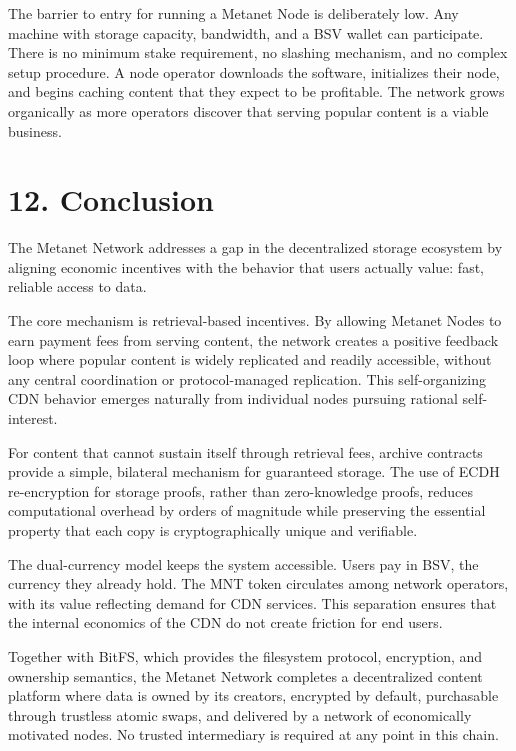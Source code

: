 \documentclass[11pt,a4paper]{article}
\begin{document}
The barrier to entry for running a Metanet Node is deliberately low. Any machine with storage capacity, bandwidth, and a BSV wallet can participate. There is no minimum stake requirement, no slashing mechanism, and no complex setup procedure. A node operator downloads the software, initializes their node, and begins caching content that they expect to be profitable. The network grows organically as more operators discover that serving popular content is a viable business.

\section{12. Conclusion}

The Metanet Network addresses a gap in the decentralized storage ecosystem by aligning economic incentives with the behavior that users actually value: fast, reliable access to data.

The core mechanism is retrieval-based incentives. By allowing Metanet Nodes to earn payment fees from serving content, the network creates a positive feedback loop where popular content is widely replicated and readily accessible, without any central coordination or protocol-managed replication. This self-organizing CDN behavior emerges naturally from individual nodes pursuing rational self-interest.

For content that cannot sustain itself through retrieval fees, archive contracts provide a simple, bilateral mechanism for guaranteed storage. The use of ECDH re-encryption for storage proofs, rather than zero-knowledge proofs, reduces computational overhead by orders of magnitude while preserving the essential property that each copy is cryptographically unique and verifiable.

The dual-currency model keeps the system accessible. Users pay in BSV, the currency they already hold. The MNT token circulates among network operators, with its value reflecting demand for CDN services. This separation ensures that the internal economics of the CDN do not create friction for end users.

Together with BitFS, which provides the filesystem protocol, encryption, and ownership semantics, the Metanet Network completes a decentralized content platform where data is owned by its creators, encrypted by default, purchasable through trustless atomic swaps, and delivered by a network of economically motivated nodes. No trusted intermediary is required at any point in this chain.
\end{document}
